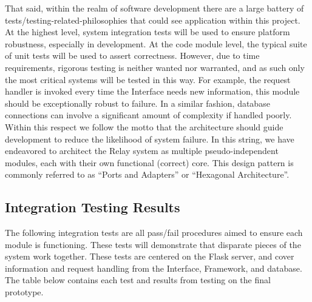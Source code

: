 \documentclass{report}
\begin{document}
That said, within the realm of software development there are a large battery of tests/testing-related-philosophies that could see application within this project.
At the highest level, system integration tests will be used to ensure platform robustness, especially in development.
At the code module level, the typical suite of unit tests will be used to assert correctness.
However, due to time requirements, rigorous testing is neither wanted nor warranted, and as such only the most critical systems will be tested in this way.
For example, the request handler is invoked every time the Interface needs new information, this module should be exceptionally robust to failure.
In a similar fashion, database connections can involve a significant amount of complexity if handled poorly.
Within this respect we follow the motto that the architecture should guide development to reduce the likelihood of system failure.
In this string, we have endeavored to architect the Relay system as multiple pseudo-independent modules, each with their own functional (correct) core.
This design pattern is commonly referred to as ``Ports and Adapters'' or ``Hexagonal Architecture''.

\subsection{Integration Testing Results}
The following integration tests are all pass/fail procedures aimed to ensure each module is functioning. 
These tests will demonstrate that disparate pieces of the system work together. 
These tests are centered on the Flask server, and cover information and request handling from the Interface, Framework, and database. 
The table below contains each test and results from testing on the final prototype.\\
\end{document}
